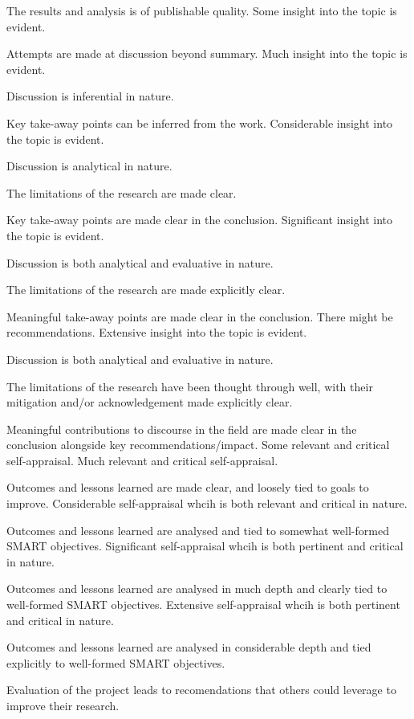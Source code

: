 \begin{markingrubric}
        \par		The results and analysis is of publishable quality.
        \grade\fail 
        \grade		Some insight into the topic is evident.
        \par		Attempts are made at discussion beyond summary.
        \grade		Much insight into the topic is evident.
        \par		Discussion is inferential in nature.
        \par		Key take-away points can be inferred from the work.
        \grade		Considerable insight into the topic is evident.
        \par		Discussion is analytical in nature.
        \par		The limitations of the research are made clear.
        \par		Key take-away points are made clear in the conclusion.
        \grade		Significant  insight into the topic is evident.
        \par		Discussion is both analytical and evaluative in nature.
        \par		The limitations of the research are made explicitly clear.
        \par		Meaningful take-away points are made clear in the conclusion. There might be recommendations.
        \grade		Extensive insight into the topic is evident.
        \par		Discussion is both analytical and evaluative in nature.
        \par		The limitations of the research have been thought through well, with their mitigation and/or acknowledgement made explicitly clear.
        \par		Meaningful contributions to discourse in the field are made clear in the conclusion alongside key recommendations/impact.
        \grade\fail 
        \grade		Some relevant and critical self-appraisal.
        \grade		Much relevant and critical self-appraisal.
        \par		Outcomes and lessons learned are made clear, and loosely tied to goals to improve.
        \grade		Considerable self-appraisal whcih is both relevant and critical in nature.
        \par		Outcomes and lessons learned are analysed and tied to somewhat well-formed SMART objectives.
        \grade		Significant self-appraisal whcih is both pertinent and critical in nature.
        \par		Outcomes and lessons learned are analysed in much depth and clearly tied to well-formed SMART objectives.
        \grade		Extensive self-appraisal whcih is both pertinent and critical in nature.
        \par		Outcomes and lessons learned are analysed in considerable depth and tied explicitly to well-formed SMART objectives. 
       \par		Evaluation of the project leads to recomendations that others could leverage to improve their research. 
\end{markingrubric}
